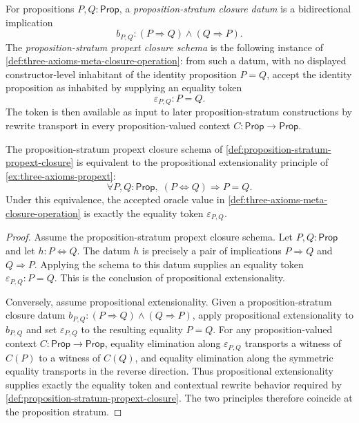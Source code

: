 \begin{definition}
\label{def:proposition-stratum-propext-closure}
For propositions $P,Q:\mathsf{Prop}$, a \emph{proposition-stratum closure datum} is a bidirectional implication
$$
b_{P,Q}:(P\Rightarrow Q)\land(Q\Rightarrow P).
$$
The \emph{proposition-stratum propext closure schema} is the following instance of \autoref{def:three-axioms-meta-closure-operation}: from such a datum, with no displayed constructor-level inhabitant of the identity proposition $P=Q$, accept the identity proposition as inhabited by supplying an equality token
$$
\varepsilon_{P,Q}:P=Q.
$$
The token is then available as input to later proposition-stratum constructions by rewrite transport in every proposition-valued context $C:\mathsf{Prop}\to\mathsf{Prop}$.
\end{definition}

\begin{theorem}
\label{thm:propext-proposition-stratum-meta-closure}
The proposition-stratum propext closure schema of \autoref{def:proposition-stratum-propext-closure} is equivalent to the propositional extensionality principle of \autoref{ex:three-axioms-propext}:
$$
\forall P,Q:\mathsf{Prop},\; (P\Leftrightarrow Q)\Rightarrow P=Q.
$$
Under this equivalence, the accepted oracle value in \autoref{def:three-axioms-meta-closure-operation} is exactly the equality token $\varepsilon_{P,Q}$.
\end{theorem}

\begin{proof}
Assume the proposition-stratum propext closure schema. Let $P,Q:\mathsf{Prop}$ and let $h:P\Leftrightarrow Q$. The datum $h$ is precisely a pair of implications $P\Rightarrow Q$ and $Q\Rightarrow P$. Applying the schema to this datum supplies an equality token $\varepsilon_{P,Q}:P=Q$. This is the conclusion of propositional extensionality.

Conversely, assume propositional extensionality. Given a proposition-stratum closure datum $b_{P,Q}:(P\Rightarrow Q)\land(Q\Rightarrow P)$, apply propositional extensionality to $b_{P,Q}$ and set $\varepsilon_{P,Q}$ to the resulting equality $P=Q$. For any proposition-valued context $C:\mathsf{Prop}\to\mathsf{Prop}$, equality elimination along $\varepsilon_{P,Q}$ transports a witness of $C(P)$ to a witness of $C(Q)$, and equality elimination along the symmetric equality transports in the reverse direction. Thus propositional extensionality supplies exactly the equality token and contextual rewrite behavior required by \autoref{def:proposition-stratum-propext-closure}. The two principles therefore coincide at the proposition stratum.
\end{proof}

